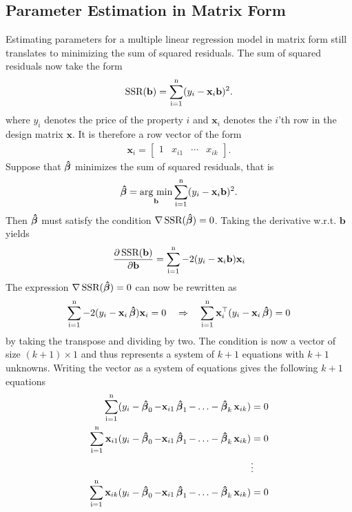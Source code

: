 \subsection{Parameter Estimation in Matrix Form}
Estimating parameters for a multiple linear regression model in matrix form still translates to minimizing the sum of squared residuals.
The sum of squared residuals now take the form
\begin{align*}
    \operatorname{\text{SSR}}(\mathbf{b}) = \operatorname{\sum_{i=1}^n} (y_i - \mathbf{x}_i\mathbf{b})^2.
\end{align*}
where $y_i$ denotes the price of the property $i$ and $\mathbf{x}_i$ denotes the $i$'th row in the design matrix $\mathbf{x}$.
It is therefore a row vector of the form
\begin{align*}
    \mathbf{x}_i = \begin{bmatrix} 1 & x_{i1} & \cdots & x_{ik} \end{bmatrix}.
\end{align*}
Suppose that $\operatorname{\boldsymbol{\hat{\beta}}}$ minimizes the sum of squared residuals, that is
\begin{align*}
    \operatorname{\boldsymbol{\hat{\beta}}} = \underset{\mathbf{b}}{\operatorname{\text{arg min}}} \operatorname{\sum_{i=1}^n} (y_i - \mathbf{x}_i\mathbf{b})^2.
\end{align*}
Then $\operatorname{\boldsymbol{\hat{\beta}}}$ must satisfy the condition $\nabla \operatorname{\text{SSR}}(\operatorname{\boldsymbol{\hat{\beta}}}) = 0$.
Taking the derivative w.r.t. $\mathbf{b}$ yields
\begin{align}\label{eq:ssr_derivative}
    \frac{\partial \operatorname{\text{SSR}}(\mathbf{b})}{\partial \mathbf{b}} 
    =  \operatorname{\sum_{i=1}^n} -2(y_i - \mathbf{x}_i \mathbf{b})\mathbf{x}_i
\end{align}
The expression $\nabla \operatorname{\text{SSR}} (\operatorname{\boldsymbol{\hat{\beta}}}) = 0$ can now be rewritten as
\begin{align*}
    \operatorname{\sum_{i=1}^n} -2(y_i - \mathbf{x}_i \operatorname{\boldsymbol{\hat{\beta}}})\mathbf{x}_i = 0 
    \quad \Rightarrow \quad
    \operatorname{\sum_{i=1}^n} \mathbf{x}_i^\top(y_i - \mathbf{x}_i \operatorname{\boldsymbol{\hat{\beta}}}) = 0
\end{align*}
by taking the transpose and dividing by two.
The condition is now a vector of size $(k + 1) \times 1$ and thus represents a system of $k + 1$ equations with $k + 1$ unknowns.
Writing the vector as a system of equations gives the following $k + 1$ equations
\begin{align}\label{eq:multiple_linear_regression_equations}
\begin{split}
    \operatorname{\sum_{i=1}^n} (y_i - \operatorname{\boldsymbol{\hat{\beta}}}_0 -  \mathbf{x}_{i1} \operatorname{\boldsymbol{\hat{\beta}}}_1 - \ldots - \operatorname{\boldsymbol{\hat{\beta}}}_k \mathbf{x}_{ik}) &= 0 \\
    \operatorname{\sum_{i=1}^n} \mathbf{x}_{i1}(y_i - \operatorname{\boldsymbol{\hat{\beta}}}_0 -  \mathbf{x}_{i1} \operatorname{\boldsymbol{\hat{\beta}}}_1 - \ldots - \operatorname{\boldsymbol{\hat{\beta}}}_k \mathbf{x}_{ik}) &= 0 \\
    &\vdots \\
    \operatorname{\sum_{i=1}^n} \mathbf{x}_{ik}(y_i - \operatorname{\boldsymbol{\hat{\beta}}}_0 -  \mathbf{x}_{i1} \operatorname{\boldsymbol{\hat{\beta}}}_1 - \ldots - \operatorname{\boldsymbol{\hat{\beta}}}_k \mathbf{x}_{ik}) &= 0
\end{split}
\end{align}
